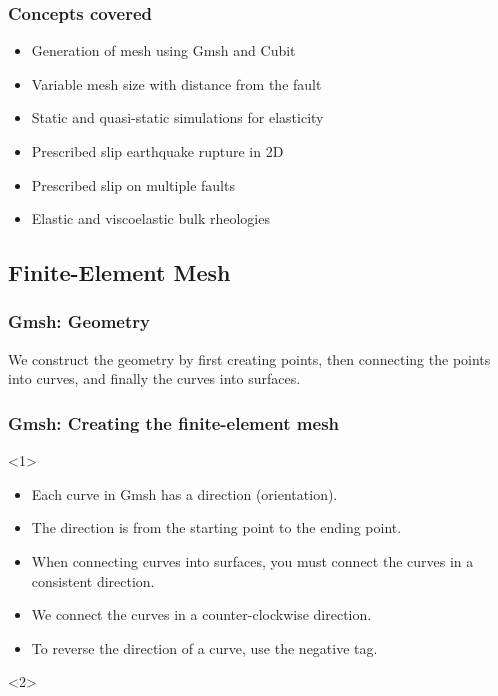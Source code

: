 \documentclass[aspectratio=169]{beamer}
\begin{document}
\begin{frame}
  \frametitle{Concepts covered}
  \summary{}

  \begin{itemize}
  \item Generation of mesh using Gmsh and Cubit
  \item Variable mesh size with distance from the fault
  \item Static and quasi-static simulations for elasticity
  \item Prescribed slip earthquake rupture in 2D
  \item Prescribed slip on multiple faults
  \item Elastic and viscoelastic bulk rheologies
  \end{itemize}
  
\end{frame}

\subsection{Finite-Element Mesh}

\begin{frame}
  \frametitle{Gmsh: Geometry}
  \summary{}

  We construct the geometry by first creating points, then connecting the points into curves, and finally the curves into surfaces.
  
  
\end{frame}


\begin{frame}
  \frametitle{Gmsh: Creating the finite-element mesh}
  \summary{}

  \begin{onlyenv}<1>
    \begin{itemize}
    \item Each curve in Gmsh has a direction (orientation).
    \item The direction is from the starting point to the ending point.
    \item When connecting curves into surfaces, you must connect the curves in a consistent direction.
    \item We connect the curves in a counter-clockwise direction.
    \item To reverse the direction of a curve, use the negative tag.
    \end{itemize}
  \end{onlyenv}
  \begin{onlyenv}<2>
  \end{onlyenv}
  
\end{frame}
\end{document}
